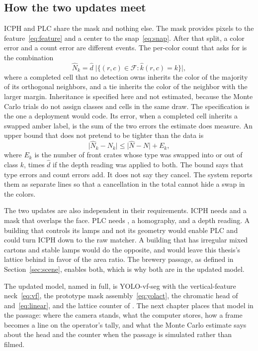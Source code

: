 

\subsection{How the two updates meet}
\label{sec:meet}

ICPH and PLC share the mask and nothing else. The mask provides pixels to the feature~\eqref{eq:feature} and a center to the snap~\eqref{eq:snap}. After that split, a color error and a count error are different events. The per-color count that  asks for is the combination
\begin{equation}
\hat{N}_{k}
= \hat{d}\;
\lvert\{ (r,c)\in\mathcal{F} : \hat{k}(r,c)=k \}\rvert,
\label{eq:per-color}
\end{equation}
where a completed cell that no detection owns inherits the color of the majority of its orthogonal neighbors, and a tie inherits the color of the neighbor with the larger margin. Inheritance is specified here and not estimated, because the Monte Carlo trials do not assign classes and cells in the same draw. The specification is the one a deployment would code. Its error, when a completed cell inherits a swapped amber label, is the sum of the two errors the estimate does measure. An upper bound that does not pretend to be tighter than the data is
\begin{equation}
\lvert\hat{N}_{k}-N_{k}\rvert
\le \lvert\hat{N}-N\rvert + E_{k},
\label{eq:bound}
\end{equation}
where $E_k$ is the number of front crates whose type was swapped into or out of class $k$, times $\hat{d}$ if the depth reading was applied to both. The bound says that type errors and count errors add. It does not say they cancel. The system reports them as separate lines so that a cancellation in the total cannot hide a swap in the colors.

The two updates are also independent in their requirements. ICPH needs  and a mask that overlaps the face. PLC needs , a homography, and a depth reading. A building that controls its lamps and not its geometry would enable PLC and could turn ICPH down to the raw matcher. A building that has irregular mixed cartons and stable lamps would do the opposite, and would leave this thesis's lattice behind in favor of the area ratio. The brewery passage, as defined in Section~\ref{sec:scene}, enables both, which is why both are in the updated model.

The updated model, named in full, is YOLO-vf-seg with the vertical-feature neck~\eqref{eq:vf}, the prototype mask assembly~\eqref{eq:yolact}, the chromatic head of  and~\eqref{eq:linear}, and the lattice counter of . The next chapter places that model in the passage: where the camera stands, what the computer stores, how a frame becomes a line on the operator's tally, and what the Monte Carlo estimate says about the head and the counter when the passage is simulated rather than filmed.
